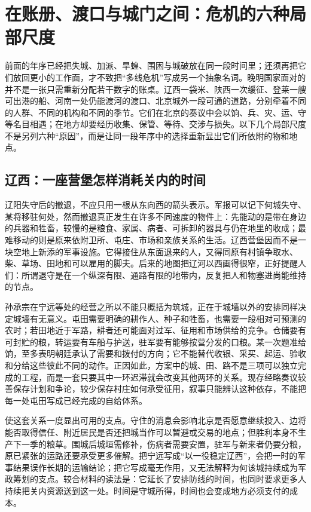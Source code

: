 \section{在账册、渡口与城门之间：危机的六种局部尺度}

前面的年序已经把失城、加派、旱蝗、围困与城破放在同一段时间里；还须再把它们放回更小的工作面，才不致把“多线危机”写成另一个抽象名词。晚明国家面对的并不是一张只需重新分配若干数字的账桌。辽西一袋米、陕西一次缓征、登莱一艘可出港的船、河南一处仍能渡河的渡口、北京城外一段可通的道路，分别牵着不同的人群、不同的机构和不同的季节。它们在北京的奏议中会以饷、兵、灾、运、守等名目相遇；在地方却要经历收集、保管、等待、交涉与损失。以下几个局部尺度不是另列六种“原因”，而是让同一段年序中的选择重新显出它们所依附的物和地点。

\subsection{辽西：一座营堡怎样消耗关内的时间}

辽阳失守后的撤退，不应只用一根从东向西的箭头表示。军报可以记下何城失守、某将移驻何处，然而撤退真正发生在许多不同速度的物件上：先能动的是带在身边的兵器和牲畜，较慢的是粮食、家属、病者、可拆卸的器具与仍在地里的收成；最难移动的则是原来依附卫所、屯庄、市场和亲族关系的生活。辽西营堡因而不是一块空地上新添的军事设施。它得接住从东面退来的人，又得同原有村镇争取水、柴、草场、田地和可以雇用的脚夫。后来的地图把辽河以西画得很窄，正好提醒人们：所谓退守是在一个纵深有限、通路有限的地带内，反复把人和物塞进尚能维持的节点。

孙承宗在宁远等处的经营之所以不能只概括为筑城，正在于城墙以外的安排同样决定城墙有无意义。屯田需要明确的耕作人、种子和牲畜，也需要一段相对可预测的农时；若田地近于军路，耕者还可能面对过军、征用和市场供给的竞争。仓储要有可封贮的粮，转运要有车船与护送，驻军要有能够按营分发的口粮。某一次题准给饷，至多表明朝廷承认了需要和拨付的方向；它不能替代收银、采买、起运、验收和分给这些彼此不同的动作。正因如此，方案中的城、田、路不是三项可以独立完成的工程，而是一套只要其中一环迟滞就会改变其他两环的关系。现存经略奏议较善保存计划和争论，较少保存村庄如何承受征用，叙事只能辨认这种依存，不能把每一处屯田写成已经完成的自给体系。

使这套关系一度显出可用的支点。守住的消息会影响北京是否愿意继续投入、边将能否取得信任、附近居民是否还把城当作可以暂避或交易的地点；但胜利本身不生产下一季的粮草。围城后城垣需修补，伤病者需要安置，驻军与新来者仍要分粮，原已紧张的运路还要承受更多催解。把宁远写成“以一役稳定辽西”，会把一时的军事结果误作长期的运输结论；把它写成毫无作用，又无法解释为何该城持续成为军政筹划的支点。较合材料的读法是：它延长了安排防线的时间，也同时要求更多人持续把关内资源送到这一处。时间是守城所得，时间也会变成地方必须支付的成本。

